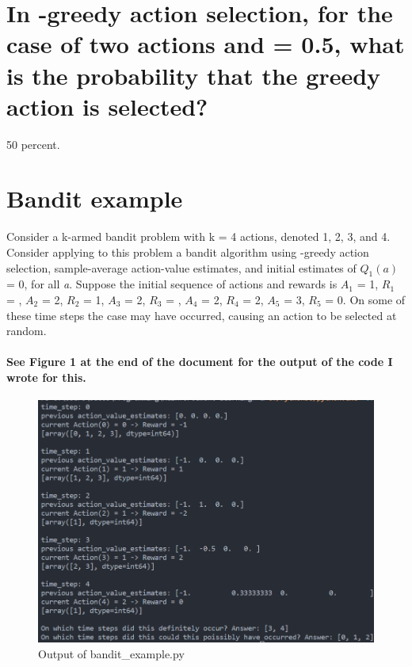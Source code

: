 \documentclass{article}
\begin{document}
\maketitle

\section{In \textepsilon-greedy action selection, for the case of two actions and \textepsilon \thickspace = 0.5, what is the probability that the greedy action is selected?}
50 percent.

\section{Bandit example}
Consider a k-armed bandit problem with k = 4 actions, denoted 1, 2, 3, and 4. 
Consider applying to this problem a bandit algorithm using \textepsilon-greedy action selection, 
sample-average action-value estimates, and initial estimates of $ Q_1(a) $ = 0, for all \emph{a}. 
Suppose the initial sequence of actions and rewards is $A_1$ = 1, $R_1$ = , $A_2$ = 2, 
$R_2$ = 1, $A_3$ = 2, $R_3$ = , $A_4$ = 2, $R_4$ = 2, $A_5$ = 3, $R_5$ = 0. 
On some of these time steps the \textepsilon \thickspace case may have occurred, causing an action 
to be selected at random.

\paragraph{See Figure 1 at the end of the document for the output of the code I wrote for this.}

\begin{figure}[b]
    \centering
    \includegraphics{bandit_example_output.png}    
    \caption{Output of bandit\_example.py}
\end{figure}
\end{document}
